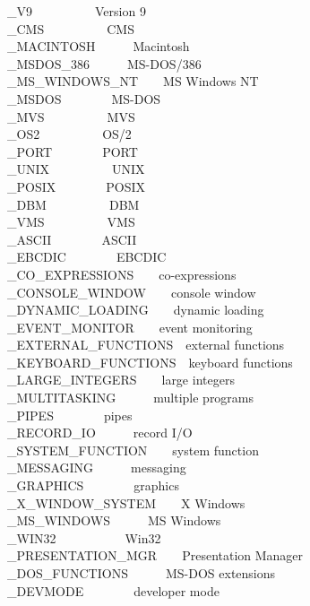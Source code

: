 \_V9\ \ \ \ \ \ \ \ \ \ Version 9\\
\_CMS\ \ \ \ \ \ \ \ \ \ CMS\\
\_MACINTOSH\ \ \ \ \ \ Macintosh\\
\_MSDOS\_386\ \ \ \ \ \ MS-DOS/386\\
\_MS\_WINDOWS\_NT\ \ \ \ MS Windows NT\\
\_MSDOS\ \ \ \ \ \ \ \ MS-DOS\\
\_MVS\ \ \ \ \ \ \ \ \ \ MVS\\
\_OS2\ \ \ \ \ \ \ \ \ \ OS/2\\
\_PORT\ \ \ \ \ \ \ \ PORT\\
\_UNIX\ \ \ \ \ \ \ \ \ \ UNIX\\
\_POSIX\ \ \ \ \ \ \ \ POSIX\\
\_DBM\ \ \ \ \ \ \ \ \ \ DBM\\
\_VMS\ \ \ \ \ \ \ \ \ \ VMS\\
\_ASCII\ \ \ \ \ \ \ \ ASCII\\
\_EBCDIC\ \ \ \ \ \ \ \ EBCDIC\\
\_CO\_EXPRESSIONS\ \ \ \ co-expressions\\
\_CONSOLE\_WINDOW\ \ \ \ console window\\
\_DYNAMIC\_LOADING\ \ \ \ dynamic loading\\
\_EVENT\_MONITOR\ \ \ \ event monitoring\\
\_EXTERNAL\_FUNCTIONS\ \ external functions\\
\_KEYBOARD\_FUNCTIONS\ \ keyboard functions\\
\_LARGE\_INTEGERS\ \ \ \ large integers\\
\_MULTITASKING\ \ \ \ \ \ multiple programs\\
\_PIPES\ \ \ \ \ \ \ \ pipes\\
\_RECORD\_IO\ \ \ \ \ \ record I/O\\
\_SYSTEM\_FUNCTION\ \ \ \ system function\\
\_MESSAGING\ \ \ \ \ \ messaging\\
\_GRAPHICS\ \ \ \ \ \ \ \ graphics\\
\_X\_WINDOW\_SYSTEM\ \ \ \ X Windows\\
\_MS\_WINDOWS\ \ \ \ \ \ MS Windows\\
\_WIN32\ \ \ \ \ \ \ \ \ \ \ Win32\\
\_PRESENTATION\_MGR\ \ \ \ Presentation Manager\\
\_DOS\_FUNCTIONS\ \ \ \ \ \ MS-DOS extensions\\
\_DEVMODE\ \ \ \ \ \ \ \ developer mode

